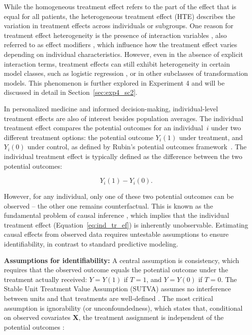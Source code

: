 While the homogeneous treatment effect refers to the part of the effect that is equal for all patients, the heterogeneous treatment effect (HTE) describes the variation in treatment effects across individuals or subgroups. One reason for treatment effect heterogeneity is the presence of interaction variables \citep{hoogland2021}, also referred to as effect modifiers \citep{christensen2021}, which influence how the treatment effect varies depending on individual characteristics. However, even in the absence of explicit interaction terms, treatment effects can still exhibit heterogeneity in certain model classes, such as logistic regression \citep{hoogland2021}, or in other subclasses of transformation models. This phenomenon is further explored in Experiment 4 and will be discussed in detail in Section~\ref{sec:exp4_sc2}.

In personalized medicine and informed decision-making, individual-level treatment effects are also of interest besides population averages. The individual treatment effect compares the potential outcomes for an individual~$i$ under two different treatment options: the potential outcome $Y_i(1)$ under treatment, and $Y_i(0)$ under control, as defined by Rubin's potential outcomes framework~\citep{rubin2005}. The individual treatment effect is typically defined as the difference between the two potential outcomes:


\begin{equation}
Y_i(1) - Y_i(0).
\label{eq:ind_tr_ef}
\end{equation}



However, for any individual, only one of these two potential outcomes can be observed -- the other one remains counterfactual. This is known as the fundamental problem of causal inference \citep{holland1986}, which implies that the individual treatment effect (Equation~\ref{eq:ind_tr_ef}) is inherently unobservable. Estimating causal effects from observed data requires untestable assumptions to ensure identifiability, in contrast to standard predictive modeling.


\medskip 

\textbf{Assumptions for identifiability:} A central assumption is consistency, which requires that the observed outcome equals the potential outcome under the treatment actually received: $Y = Y(1)$ if $T = 1$, and $Y = Y(0)$ if $T = 0$. The Stable Unit Treatment Value Assumption (SUTVA) assumes no interference between units and that treatments are well-defined \citep{rubin1980}. The most critical assumption is ignorability (or unconfoundedness), which states that, conditional on observed covariates $\mathbf{X}$, the treatment assignment is independent of the potential outcomes \citep{rosenbaum1983}:

